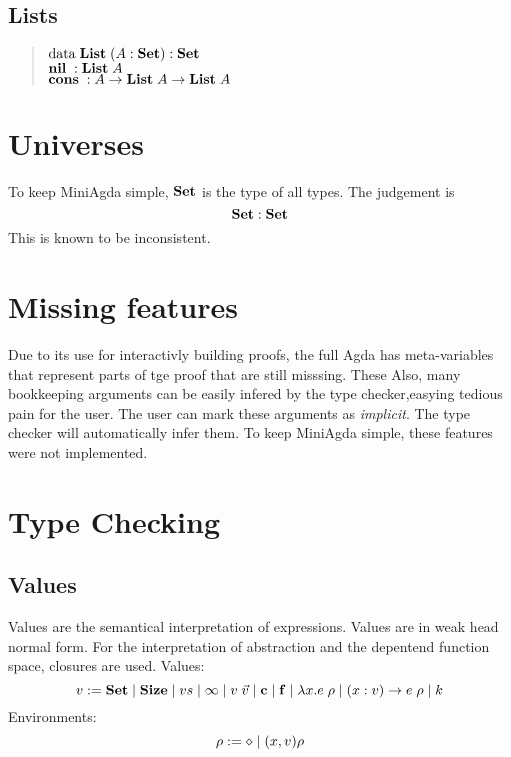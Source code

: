\subsection{Lists}
\begin{quote}
$\mathrm{data}\; \mathbf{List}\; ( A : \mathbf{Set} ) : \mathbf{Set} $ 
\\
$\mathbf{nil}\; : \mathbf{List}\; A  $
\\
$\mathbf{cons}\; : A \rightarrow \mathbf{List}\; A \rightarrow \mathbf{List}\; A $
\end{quote}


\section{Universes}
To keep MiniAgda simple, $\mathbf{Set}$ is the type of all types.
The judgement is
\[\mathbf{Set} : \mathbf{Set} \]
This is known to be inconsistent.
\section{Missing features}
Due to its use for interactivly building proofs, the full Agda has meta-variables that represent parts of tge proof that are still misssing. These 
Also, many bookkeeping arguments can be easily infered by the type checker,easying tedious pain for the user.
The user can mark these arguments as \emph{implicit}. The type checker will automatically infer them.
To keep MiniAgda simple, these features were not implemented.



\section{Type Checking}

\renewcommand\Check[4]{#1,#2\;\vdash\;#3\uparrow#4}
\newcommand\Infer[4]{#1,#2\;\vdash\;#3\downarrow#4}
\newcommand\IsType[3]{#1,#2\;\vdash\;#3\uparrow\Set}
\newcommand\EqVal[2]{\vdash\;#1\leftrightarrow#2}
\newcommand\Eval[3]{\mathrm{eval}\;#1\;#2\leadsto#3}
\newcommand\App[3]{\mathrm{app}\;#1,#2\leadsto#3}
\newcommand\AppFun[3]{\mathrm{appFun}\;#1,#2,\leadsto#3}
\newcommand\Fapp[6]{\mathrm{fapp}\;#1,#2,#3,#4,#5\leadsto#6}
\newcommand\Lookup[3]{#1(#2) = #3}

\subsection{Values}
Values are the semantical interpretation of expressions.
Values are in weak head normal form.
For the interpretation of abstraction and the depentend function space, closures are used.
Values:
\[ v := \mathbf{Set} \;\vert\; \mathbf{Size} \;\vert\; vs \;\vert\; \infty \;\vert\; v \; \vec{v} \;\vert\; \mathbf{c} \;\vert\; \mathbf{f} \;\vert\; \lambda x . e \; \rho \;\vert\; ( x : v ) \rightarrow e \; \rho \;\vert\; k \]
Environments:
\[ \rho := \diamond \;\vert\; (x,v) \rho \]

